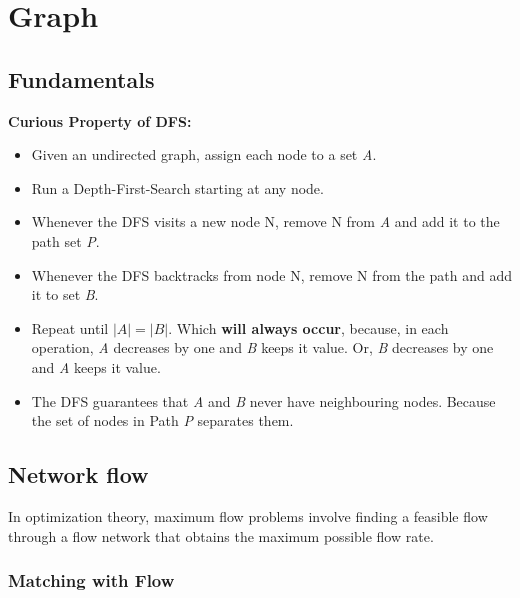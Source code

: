 \chapter{Graph}

\section{Fundamentals}

	\textbf{Curious Property of DFS:} 
	
	\begin{itemize}
	\item Given an undirected graph, assign each node to a set \textit{A}.
	\item Run a Depth-First-Search starting at any node.
	\item Whenever the DFS visits a new node N, remove N from \textit{A} and add it to the path set \textit{P}.
	\item Whenever the DFS backtracks from node N, remove N from the path and add it to set \textit{B}.
	\item Repeat until $|A| = |B|$. Which \textbf{will always occur}, because, in each operation, \textit{A} decreases by one and \textit{B} keeps it value. 
	Or, \textit{B} decreases by one and \textit{A} keeps it value.
	\item The DFS guarantees that \textit{A} and \textit{B} never have neighbouring nodes. 
	Because the set of nodes in Path \textit{P} separates them.
	\end{itemize}
	


\section{Network flow}

	In optimization theory, maximum flow problems involve finding a 
	feasible flow through a flow network that obtains the maximum possible flow rate. 

	

    \vspace{6pts}

	\subsection{Matching with Flow}

